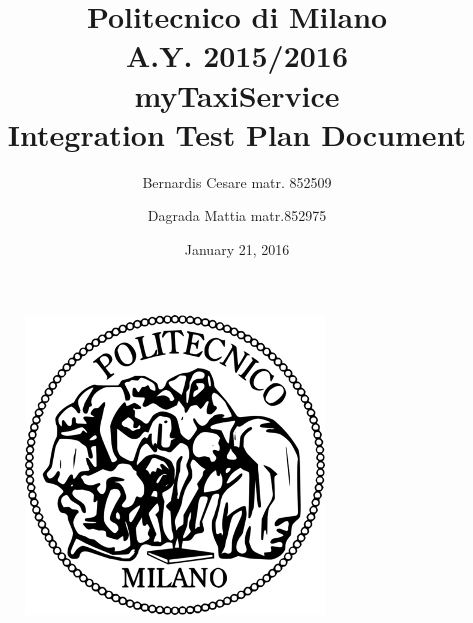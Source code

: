 \documentclass[11pt,a4paper,titlepage]{article}
\begin{document}
\begin{figure}
	\centering
	\includegraphics[scale=0.6]{../SE2_IMAGES/Logo_Politecnico_Milano}
\end{figure}
\title{Politecnico di Milano\\A.Y. 2015/2016\\\textbf{myTaxiService}\\Integration Test Plan Document\\}
\author{Bernardis Cesare matr. 852509 \and Dagrada Mattia matr.852975}
\date{January 21, 2016}
\maketitle

\newpage

\tableofcontents

\newpage







\end{document}
